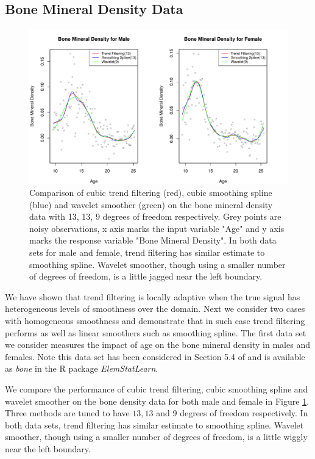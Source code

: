 \documentclass[a4paper]{article}
\begin{document}
\subsection{Bone Mineral Density Data}
\label{subsec:bone}

\begin{figure}[t!]
\centering
\includegraphics[width = 1\textwidth]{Figures/Figure9b.pdf}
\caption{Comparison of cubic trend filtering (red), cubic smoothing spline (blue) and wavelet smoother (green) on the bone mineral density data with 13, 13, 9 degrees of freedom respectively. Grey points are noisy observations, x axis marks the input variable "Age" and y axis marks the response variable "Bone Mineral Density". In both data sets for male and female, trend filtering has similar estimate to smoothing spline. Wavelet smoother, though using a smaller number of degrees of freedom, is a little jagged near the left boundary.}
\label{fig:real_bone}
\end{figure}
We have shown that trend filtering is locally adaptive when the true signal has heterogeneous levels of smoothness over the domain. Next we consider two cases with homogeneous smoothness and demonstrate that in such case trend filtering performs as well as linear smoothers such as smoothing spline. The first data set we consider measures the impact of age on the bone mineral density in males and females. Note this data set has been considered in Section 5.4 of \cite{friedman2001elements} and is available as \textit{bone} in the R package \textit{ElemStatLearn}. 

We compare the performance of cubic trend filtering, cubic smoothing spline and wavelet smoother on the bone density data for both male and female in Figure \ref{fig:real_bone}. Three methods are tuned to have $13, 13$ and $9$ degrees of freedom respectively. In both data sets, trend filtering has similar estimate to smoothing spline. Wavelet smoother, though using a smaller number of degrees of freedom, is a little wiggly near the left boundary.
\end{document}
